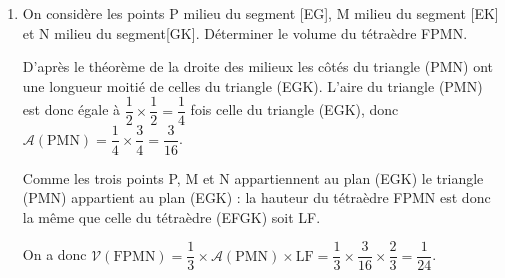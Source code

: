 \begin{enumerate}
On a aussi $\mathcal{V}(\text{EFGK}) = \dfrac13 \times \mathcal{A}(\text{EGK}) \times \text{LF}$, soit $\dfrac16 = \dfrac13 \times \mathcal{A}(\text{EGK}) \times \dfrac23$ ou encore

$\dfrac16 = \dfrac29 \times \mathcal{A}(\text{EGK})$, d'où $\mathcal{A}(\text{EGK}) = \dfrac{\frac16}{\frac29} = \dfrac16 \times \dfrac92 = \dfrac{9}{12} = \dfrac34$.
\item On considère les points P milieu du segment [EG], M milieu du segment [EK] et N milieu du segment[GK]. Déterminer le volume du tétraèdre FPMN.

D'après le théorème de la droite des milieux les côtés du triangle (PMN) ont une longueur moitié de celles du triangle (EGK). L'aire du triangle (PMN) est donc égale à $\dfrac12 \times \dfrac12 = \dfrac14$ fois celle du triangle (EGK), donc $\mathcal{A}(\text{PMN}) = \dfrac14 \times \dfrac34 = \dfrac{3}{16}$.

Comme les trois points P, M et N appartiennent au plan (EGK) le triangle (PMN) appartient au plan (EGK) : la hauteur du tétraèdre FPMN est donc la même que celle du tétraèdre (EFGK) soit LF.

On a donc $\mathcal{V}(\text{FPMN}) = \dfrac13 \times \mathcal{A}(\text{PMN}) \times \text{LF} = \dfrac13 \times \dfrac{3}{16} \times \dfrac{2}{3} = \dfrac{1}{24}$.
\end{enumerate}

\bigskip
